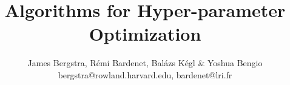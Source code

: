 \documentclass[12pt]{scrartcl}
\begin{document}

\greenposter 

\title{Algorithms for Hyper-parameter Optimization}

\subtitle{James Bergstra, R\'{e}mi Bardenet, Bal\'{a}zs K\'{e}gl \&
  Yoshua Bengio \quad
  \small{bergstra@rowland.harvard.edu}, \small{bardenet@lri.fr}}


\setlength{\itemsep}{0pt}
\setlength{\parsep}{0pt}
\setlength{\topsep}{0pt}
\setlength{\partopsep}{0pt}

\makeposter
 \small





   
\end{document}
